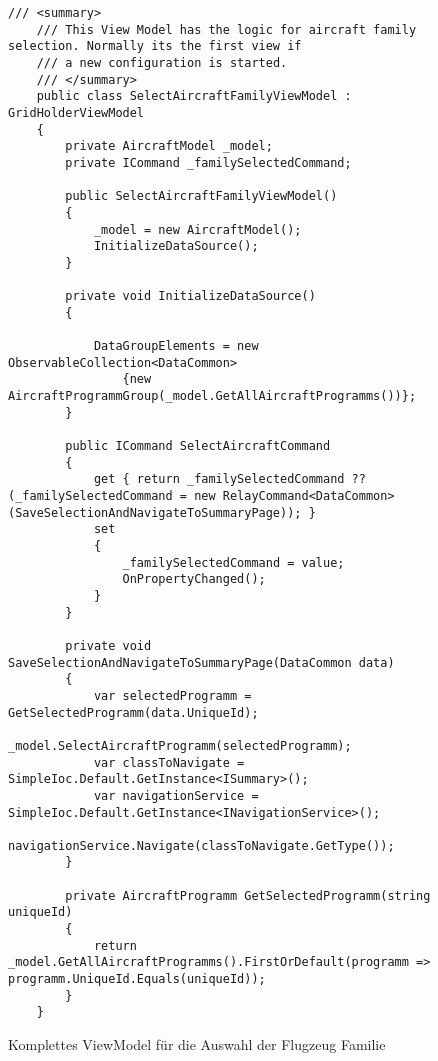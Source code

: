 

\begin{figure}
\begin{lstlisting}
/// <summary>
    /// This View Model has the logic for aircraft family selection. Normally its the first view if
    /// a new configuration is started.
    /// </summary>
    public class SelectAircraftFamilyViewModel : GridHolderViewModel
    {
        private AircraftModel _model;
        private ICommand _familySelectedCommand;

        public SelectAircraftFamilyViewModel()
        {
            _model = new AircraftModel();
            InitializeDataSource();
        }

        private void InitializeDataSource()
        {

            DataGroupElements = new ObservableCollection<DataCommon>
                {new AircraftProgrammGroup(_model.GetAllAircraftProgramms())}; 
        }

        public ICommand SelectAircraftCommand
        {
            get { return _familySelectedCommand ?? (_familySelectedCommand = new RelayCommand<DataCommon>(SaveSelectionAndNavigateToSummaryPage)); }
            set
            {
                _familySelectedCommand = value;
                OnPropertyChanged();
            }
        }

        private void SaveSelectionAndNavigateToSummaryPage(DataCommon data)
        {
            var selectedProgramm = GetSelectedProgramm(data.UniqueId);
            _model.SelectAircraftProgramm(selectedProgramm);
            var classToNavigate = SimpleIoc.Default.GetInstance<ISummary>();
            var navigationService = SimpleIoc.Default.GetInstance<INavigationService>();
            navigationService.Navigate(classToNavigate.GetType());
        }

        private AircraftProgramm GetSelectedProgramm(string uniqueId)
        {
            return _model.GetAllAircraftProgramms().FirstOrDefault(programm => programm.UniqueId.Equals(uniqueId));
        }
    }
\end{lstlisting} 
\caption{Komplettes ViewModel für die Auswahl der Flugzeug Familie}
\label{aircraftFamilySelectionViewModel}
\end{figure}
 




